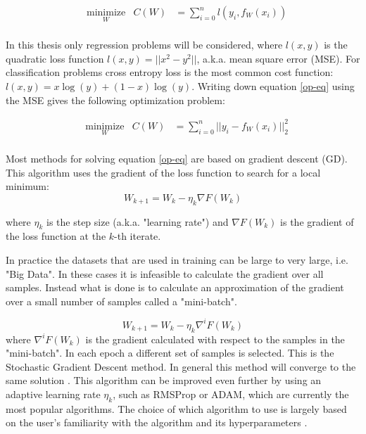 \begin{equation}
\begin{aligned}
& \underset{W}{\text{minimize}}
& C(W) &= \sum\limits_{i=0}^{n}l(y_i,f_W(x_i)) \\
\end{aligned}
\label{op-eq}
\end{equation}

In this thesis only regression problems will be considered, where $l(x,y)$ is the quadratic loss function $l(x,y) = ||x^2-y^2||$, a.k.a. mean square error (MSE). For classification problems cross entropy loss is the most common cost function: $l(x,y) = x\log(y)+(1-x)\log(y)$. Writing down equation \ref{op-eq} using the MSE gives the following optimization problem:

\begin{equation}
\begin{aligned}
& \underset{W}{\text{minimize}}
& C(W) &= \sum\limits_{i=0}^{n}||y_i - f_W(x_i)||^2_2 \\
\end{aligned}
\label{op2-eq}
\end{equation}

Most methods for solving equation \ref{op-eq} are based on gradient descent (GD). This algorithm uses the gradient of the loss function to search for a local minimum:
\begin{equation}
W_{k+1} = W_{k} - \eta_k\nabla F(W_k)
\label{gd-eq}
\end{equation}

where $\eta_k$ is the step size (a.k.a. "learning rate") and $\nabla F(W_k)$ is the gradient of the loss function at the $k$-th iterate.

In practice the datasets that are used in training can be large to very large, i.e. "Big Data". In these cases it is infeasible to calculate the gradient over all samples. Instead what is done is to calculate an approximation of the gradient over a small number of samples called a "mini-batch".

\begin{equation}
W_{k+1} = W_{k} - \eta_k\nabla^i F(W_k)
\label{gd-eq}
\end{equation}
where $\nabla^i F(W_k)$ is the gradient calculated with respect to the samples in the "mini-batch". In each epoch a different set of samples is selected. This is the Stochastic Gradient Descent method. In general this method will converge to the same solution \cite{Bottou2005}. This algorithm can be improved even further by using an adaptive learning rate $\eta_k$, such as RMSProp or ADAM, which are currently the most popular algorithms. The choice of which algorithm to use is largely based on the user's familiarity with the algorithm and its hyperparameters \cite{Goodfellow-et-al-2016}.

